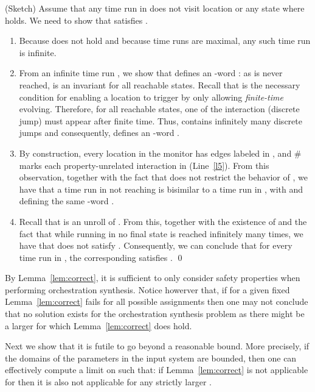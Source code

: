 \proof (Sketch) Assume that any time run  in
 does not visit location  or
any state where  holds. We need to show that
 satisfies .
\begin{enumerate}
\item 	Because  does not hold and because time runs are maximal, any such time run  is infinite. 
\item From an infinite time run , we show that  defines an
  -word : as  is
  never reached, 
  is an invariant for all reachable states. Recall that 
  is the necessary condition for enabling a location to trigger
   by only allowing \emph{finite-time} evolving. Therefore,
  for all reachable states, one of the interaction (discrete jump)
  must appear after finite time. Thus,  contains infinitely many
  discrete jumps and consequently,  defines an -word
  .
\item By construction, every location in the monitor has edges labeled
  in , and \# marks each
  property-unrelated interaction in  (Line~\ref{l5}). From this observation,
  together with the fact that  does not
  restrict the behavior of , we have that a time
  run  in  not reaching 
  is bisimilar to a time run  in , with
   and  defining the same -word .
\item Recall that  is an unroll of
  . From this, together with the
  existence of  and the fact that while running
   in  no final state is
  reached infinitely many times, we have that  does not
  satisfy . Consequently, we can conclude that for
  every time run  in , the corresponding
   satisfies . \qed
\end{enumerate}
\newcommand{\mk}{k^*}
By Lemma~\ref{lem:correct}, it is sufficient to only consider safety
properties when performing orchestration synthesis.
Notice howerver that,  if for a given fixed  Lemma~\ref{lem:correct} fails for all possible
assignments  then one may not conclude that no solution exists for
the orchestration synthesis problem as there might be a larger  for
which Lemma~\ref{lem:correct} does hold.



Next we show that it is futile to go beyond a reasonable bound. More precisely, if the domains of the parameters in the input system  are bounded, then one can effectively compute a limit  on  such that: if Lemma~\ref{lem:correct} is not applicable for  then it is also not applicable for any strictly larger \@. 













